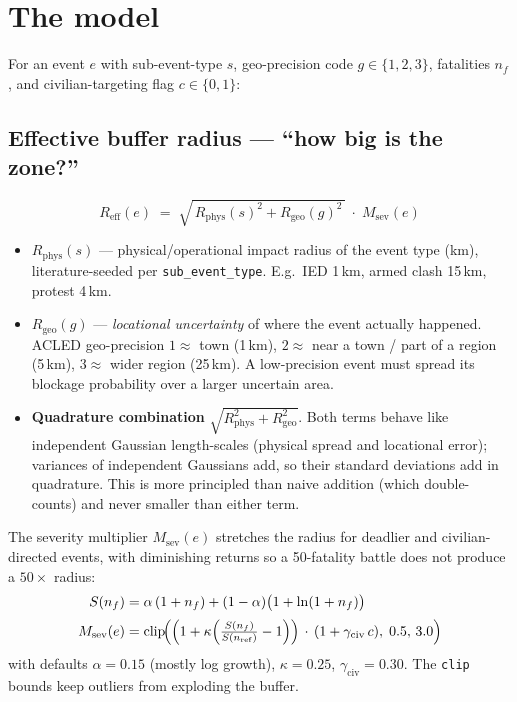 \documentclass[11pt,a4paper]{article}
\newcommand{\code}[1]{\texttt{\small #1}}
\newcommand{\Reff}{R_{\mathrm{eff}}}
\newcommand{\Rphys}{R_{\mathrm{phys}}}
\newcommand{\Rgeo}{R_{\mathrm{geo}}}
\newcommand{\Msev}{M_{\mathrm{sev}}}
\begin{document}
\section{The model}

For an event $e$ with sub-event-type $s$, geo-precision code $g\in\{1,2,3\}$, fatalities
$n_f$, and civilian-targeting flag $c\in\{0,1\}$:

\subsection{Effective buffer radius --- ``how big is the zone?''}

\begin{equation}
\Reff(e) \;=\; \sqrt{\,\Rphys(s)^2 + \Rgeo(g)^2\,}\;\cdot\;\Msev(e)
\label{eq:reff}
\end{equation}

\begin{itemize}[nosep,leftmargin=1.4em]
  \item $\Rphys(s)$ --- physical/operational impact radius of the event type (km),
        literature-seeded per \code{sub\_event\_type}. E.g.\ IED 1\,km, armed clash 15\,km,
        protest 4\,km.
  \item $\Rgeo(g)$ --- \emph{locational uncertainty} of where the event actually happened.
        ACLED geo-precision $1\approx$ town (1\,km), $2\approx$ near a town / part of a region
        (5\,km), $3\approx$ wider region (25\,km). A low-precision event must spread its
        blockage probability over a larger uncertain area.
  \item \textbf{Quadrature combination} $\sqrt{\Rphys^2+\Rgeo^2}$. Both terms behave like
        independent Gaussian length-scales (physical spread and locational error); variances of
        independent Gaussians add, so their standard deviations add in quadrature. This is more
        principled than naive addition (which double-counts) and never smaller than either term.
\end{itemize}

The severity multiplier $\Msev(e)$ stretches the radius for deadlier and civilian-directed
events, with diminishing returns so a 50-fatality battle does not produce a $50\times$ radius:
\begin{align}
S(n_f)   &= \alpha\,(1+n_f) + (1-\alpha)\bigl(1+\ln(1+n_f)\bigr) \label{eq:sev}\\[2pt]
\Msev(e) &= \operatorname{clip}\!\Bigl(\Bigl(1 + \kappa\Bigl(\tfrac{S(n_f)}{S(n_{\mathrm{ref}})}-1\Bigr)\Bigr)
            \,\cdot\,(1+\gamma_{\mathrm{civ}}\,c),\;0.5,\,3.0\Bigr) \label{eq:msev}
\end{align}
with defaults $\alpha=0.15$ (mostly log growth), $\kappa=0.25$, $\gamma_{\mathrm{civ}}=0.30$.
The \code{clip} bounds keep outliers from exploding the buffer.
\end{document}
